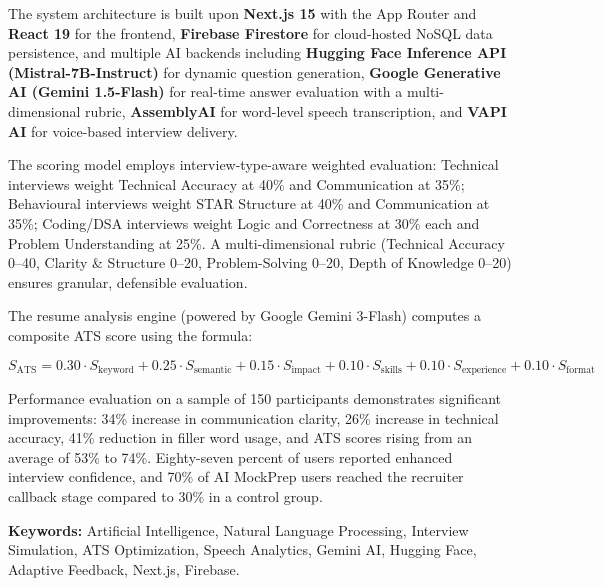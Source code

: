 \documentclass[12pt,a4paper,oneside]{report}
\begin{document}
The system architecture is built upon \textbf{Next.js 15} with the App Router and \textbf{React 19} for the frontend, \textbf{Firebase Firestore} for cloud-hosted NoSQL data persistence, and multiple AI backends including \textbf{Hugging Face Inference API (Mistral-7B-Instruct)} for dynamic question generation, \textbf{Google Generative AI (Gemini 1.5-Flash)} for real-time answer evaluation with a multi-dimensional rubric, \textbf{AssemblyAI} for word-level speech transcription, and \textbf{VAPI AI} for voice-based interview delivery.

The scoring model employs interview-type-aware weighted evaluation: Technical interviews weight Technical Accuracy at 40\% and Communication at 35\%; Behavioural interviews weight STAR Structure at 40\% and Communication at 35\%; Coding/DSA interviews weight Logic and Correctness at 30\% each and Problem Understanding at 25\%. A multi-dimensional rubric (Technical Accuracy 0--40, Clarity \& Structure 0--20, Problem-Solving 0--20, Depth of Knowledge 0--20) ensures granular, defensible evaluation.

The resume analysis engine (powered by Google Gemini 3-Flash) computes a composite ATS score using the formula:

\[
S_{\text{ATS}} = 0.30 \cdot S_{\text{keyword}} + 0.25 \cdot S_{\text{semantic}} + 0.15 \cdot S_{\text{impact}} + 0.10 \cdot S_{\text{skills}} + 0.10 \cdot S_{\text{experience}} + 0.10 \cdot S_{\text{format}}
\]

Performance evaluation on a sample of 150 participants demonstrates significant improvements: 34\% increase in communication clarity, 26\% increase in technical accuracy, 41\% reduction in filler word usage, and ATS scores rising from an average of 53\% to 74\%. Eighty-seven percent of users reported enhanced interview confidence, and 70\% of AI MockPrep users reached the recruiter callback stage compared to 30\% in a control group.

\textbf{Keywords:} Artificial Intelligence, Natural Language Processing, Interview Simulation, ATS Optimization, Speech Analytics, Gemini AI, Hugging Face, Adaptive Feedback, Next.js, Firebase.

\newpage
\tableofcontents

\newpage
\listoffigures

\newpage
\listoftables
\end{document}
